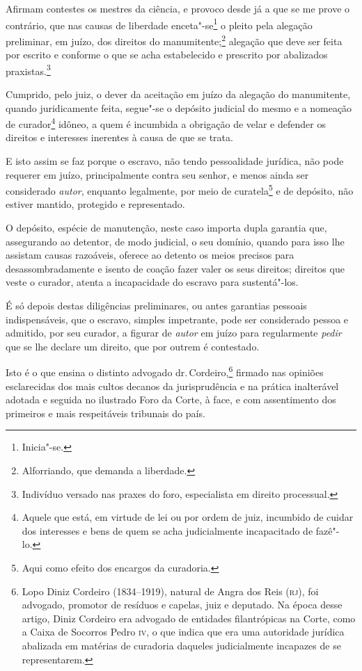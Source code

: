 \asterisc

Afirmam contestes os mestres da ciência, e provoco desde já a que se me
prove o contrário, que nas causas de liberdade enceta"-se\footnote{
  Inicia"-se.} o pleito pela alegação preliminar, em juízo, dos direitos
do manumitente;\footnote{Alforriando, que demanda a liberdade.}
alegação que deve ser feita por escrito e conforme o que se acha
estabelecido e prescrito por abalizados praxistas.\footnote{Indivíduo
  versado nas praxes do foro, especialista em direito processual.}

Cumprido, pelo juiz, o dever da aceitação em juízo da alegação do
manumitente, quando juridicamente feita, segue"-se o depósito judicial do
mesmo e a nomeação de curador\footnote{Aquele que está, em virtude de
  lei ou por ordem de juiz, incumbido de cuidar dos interesses e bens de
  quem se acha judicialmente incapacitado de fazê"-lo.} idôneo, a quem é
incumbida a obrigação de velar e defender os direitos e interesses
inerentes à causa de que se trata.

E isto assim se faz porque o escravo, não tendo pessoalidade jurídica,
não pode requerer em juízo, principalmente contra seu senhor, e menos
ainda ser considerado \emph{autor}, enquanto legalmente, por meio de
curatela\footnote{Aqui como efeito dos encargos da curadoria.} e de
depósito, não estiver mantido, protegido e representado.

O depósito, espécie de manutenção, neste caso importa dupla garantia
que, assegurando ao detentor, de modo judicial, o seu domínio, quando
para isso lhe assistam causas razoáveis, oferece ao detento os meios
precisos para desassombradamente e isento de coação fazer valer os seus
direitos; direitos que veste o curador, atenta a incapacidade do escravo
para sustentá"-los.

É só depois destas diligências preliminares, ou antes garantias pessoais
indispensáveis, que o escravo, simples impetrante, pode ser considerado
pessoa e admitido, por seu curador, a figurar de \emph{autor} em juízo
para regularmente \emph{pedir} que se lhe declare um direito, que por
outrem é contestado.

Isto é o que ensina o distinto advogado dr.\,Cordeiro,\footnote{Lopo
  Diniz Cordeiro (1834--1919), natural de Angra dos Reis (\textsc{rj}), foi
  advogado, promotor de resíduos e capelas, juiz e deputado. Na época
  desse artigo, Diniz Cordeiro era advogado de entidades filantrópicas
  na Corte, como a Caixa de Socorros Pedro \textsc{iv}, o que indica que era uma
  autoridade jurídica abalizada em matérias de curadoria daqueles
  judicialmente incapazes de se representarem.} firmado nas opiniões
esclarecidas dos mais cultos decanos da jurisprudência e na prática
inalterável adotada e seguida no ilustrado Foro da Corte, à face, e com
assentimento dos primeiros e mais respeitáveis tribunais do país.

